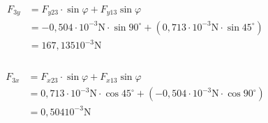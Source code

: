 \begin{enumerate}
        \begin{align*}
          F_{3y} & = F_{y23}\cdot\sin{\varphi}+F_{y13}\sin{\varphi}                                                  \\
                 & =  -0,504\cdot 10^{-3}\text{N}\cdot\sin{90^\circ}+(0,713\cdot 10^{-3}\text{N}\cdot\sin{45^\circ}) \\
                 & = 167,135 10^{-3}\text{N}                                                                         \\                                                                                                                                                                 \\
        \end{align*}

        \begin{align*}
          F_{3x} & = F_{x23}\cdot\sin{\varphi}+F_{x13}\sin{\varphi}                                                  \\
                 & =  0,713\cdot 10^{-3}\text{N}\cdot\cos{45^\circ}+(-0,504\cdot 10^{-3}\text{N}\cdot\cos{90^\circ}) \\
                 & = 0,504 10^{-3}\text{N}                                                                           \\                                                                                                                                                                 \\
        \end{align*}

\end{enumerate}
